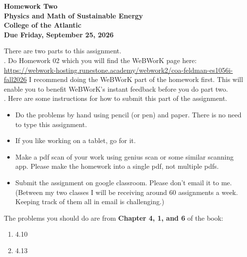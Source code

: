 \documentclass[12pt]{article}
\begin{document}
\pagestyle{empty}
 
\begin{center}
{\LARGE {\bf Homework Two}}\\
\bigskip
{\Large {\bf Physics and Math of Sustainable Energy}}\\
\bigskip
{\Large {\bf College of the Atlantic}}\\
\bigskip
{ {\bf Due Friday, September 25, 2026}}\\ 
\end{center}
\medskip


\noindent There are two parts to this assignment.\\

.  Do Homework 02 which you
will find the WeBWorK page here: \url{https://webwork-hosting.runestone.academy/webwork2/coa-feldman-es1056i-fall2026}
I recommend doing the WeBWorK part of the homework first.  This will
enable you to benefit WeBWorK's instant feedback before you do part
two.\\ 


.  Here are some
instructions for how to submit this part of the assignment.
\begin{itemize}
\item Do the problems by hand using pencil (or pen) and paper.
  There is no need to type this assignment.
\item If you like working on a tablet, go for it. 
\item Make a pdf scan of your work using genius scan or some
  similar scanning app.  Please make the homework into a single
  pdf, not multiple pdfs.
\item Submit the assignment on google classroom.  Please don't
  email it to me.  (Between my two classes I will be receiving
  around 60 assignments a week.  Keeping track of them all in email 
  is challenging.)\\
\end{itemize}

\noindent The problems you should do are from {\bf Chapter 4, 1, and
  6} of the book: \\

\begin{enumerate}
\setlength{\itemsep}{-1mm}
\item 4.10
\item 4.13\\
\end{enumerate}
\end{document}
